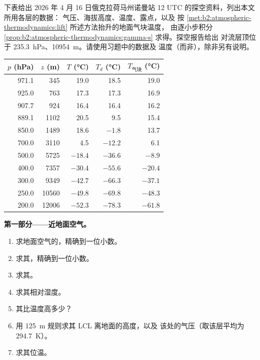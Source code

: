 \begin{problem}\label{pb:b2:atmospheric-thermodynamics:1}
下表给出 2026 年 4 月 16 日俄克拉荷马州诺曼站 12 UTC 的探空资料，列出本文所用各层的数据：
气压、海拔高度、温度、露点，以及
按 \cref{met:b2:atmospheric-thermodynamics:lift} 所述方法抬升的地面气块温度，
由逐小步积分 \cref{prop:b2:atmospheric-thermodynamics:gamma-s} 求得。探空报告给出
对流层顶位于 \qty{235.3}{hPa}、\qty{10954}{m}。请使用习题中的数据及
温度（而非），除非另有说明。

\begin{center}
\small
\begin{tabular}{rrrrr}
\hline
$p$ (\unit{hPa}) & $z$ (\unit{m}) & $T$ (\unit{\celsius}) & $T_d$ (\unit{\celsius}) &
$T_{\text{气块}}$ (\unit{\celsius}) \\
\hline
971.1 & 345 & 19.0 & 18.5 & 19.0 \\
925.0 & 763 & 17.3 & 17.3 & 16.9 \\
907.7 & 924 & 16.4 & 16.4 & 16.2 \\
889.1 & 1102 & 20.5 & 9.5 & 15.4 \\
850.0 & 1489 & 18.6 & $-1.8$ & 13.7 \\
700.0 & 3110 & 4.5 & $-12.2$ & 6.1 \\
500.0 & 5725 & $-18.4$ & $-36.6$ & $-8.9$ \\
400.0 & 7357 & $-30.4$ & $-55.6$ & $-20.4$ \\
300.0 & 9349 & $-42.7$ & $-66.3$ & $-37.1$ \\
250.0 & 10560 & $-49.8$ & $-69.8$ & $-48.3$ \\
200.0 & 12006 & $-52.3$ & $-78.3$ & $-61.8$ \\
\hline
\end{tabular}
\end{center}

\medskip\noindent\textbf{第一部分——近地面空气。}
\begin{enumerate}
  \item 求地面空气的，精确到一位小数。
  \item 求其，精确到一位小数。
  \item 求其。
  \item 求其相对湿度。
  \item 其比温度高多少？
  \item 用 \qty{125}{m} 规则求其 LCL 离地面的高度，以及
        该处的气压（取该层平均为 \qty{294.7}{K}）。
  \item 求其位温。
\end{enumerate}


\end{problem}
